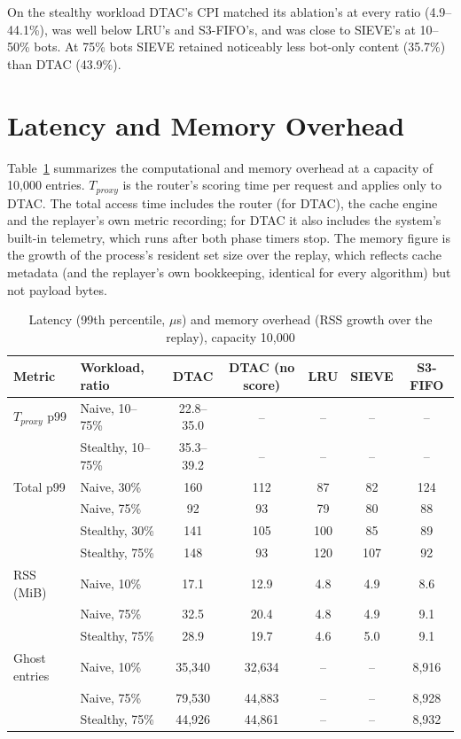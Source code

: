 On the stealthy workload DTAC's CPI matched its ablation's at every ratio (4.9--44.1\%), was well below LRU's and S3-FIFO's, and was close to SIEVE's at 10--50\% bots. At 75\% bots SIEVE retained noticeably less bot-only content (35.7\%) than DTAC (43.9\%).

\section{Latency and Memory Overhead}
Table~\ref{tab:overhead} summarizes the computational and memory overhead at a capacity of 10{,}000 entries. $T_{proxy}$ is the router's scoring time per request and applies only to DTAC. The total access time includes the router (for DTAC), the cache engine and the replayer's own metric recording; for DTAC it also includes the system's built-in telemetry, which runs after both phase timers stop. The memory figure is the growth of the process's resident set size over the replay, which reflects cache metadata (and the replayer's own bookkeeping, identical for every algorithm) but not payload bytes.

\begin{table}[htbp]
    \centering
    \caption{Latency (99th percentile, $\mu$s) and memory overhead (RSS growth over the replay), capacity 10{,}000}
    \label{tab:overhead}
    \small
    \setlength{\tabcolsep}{4pt}
    \begin{tabular}{llccccc}
        \toprule
        Metric & Workload, ratio & DTAC & DTAC (no score) & LRU & SIEVE & S3-FIFO \\
        \midrule
        $T_{proxy}$ p99 & Naive, 10--75\% & 22.8--35.0 & -- & -- & -- & -- \\
         & Stealthy, 10--75\% & 35.3--39.2 & -- & -- & -- & -- \\
        \midrule
        Total p99 & Naive, 30\% & 160 & 112 & 87 & 82 & 124 \\
         & Naive, 75\% & 92 & 93 & 79 & 80 & 88 \\
         & Stealthy, 30\% & 141 & 105 & 100 & 85 & 89 \\
         & Stealthy, 75\% & 148 & 93 & 120 & 107 & 92 \\
        \midrule
        RSS (MiB) & Naive, 10\% & 17.1 & 12.9 & 4.8 & 4.9 & 8.6 \\
         & Naive, 75\% & 32.5 & 20.4 & 4.8 & 4.9 & 9.1 \\
         & Stealthy, 75\% & 28.9 & 19.7 & 4.6 & 5.0 & 9.1 \\
        \midrule
        Ghost entries & Naive, 10\% & 35{,}340 & 32{,}634 & -- & -- & 8{,}916 \\
         & Naive, 75\% & 79{,}530 & 44{,}883 & -- & -- & 8{,}928 \\
         & Stealthy, 75\% & 44{,}926 & 44{,}861 & -- & -- & 8{,}932 \\
        \bottomrule
    \end{tabular}
\end{table}

